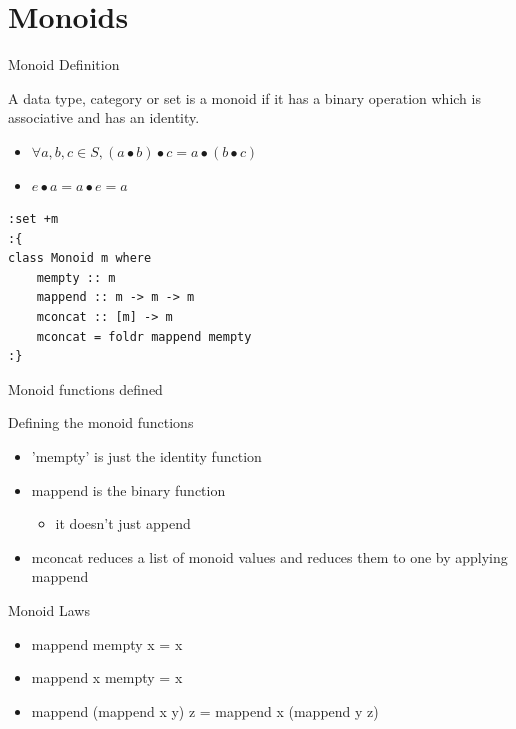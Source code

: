 \documentclass[presetation]{beamer}
\begin{document}
\section{Monoids}
\label{sec:org2d0884c}
\begin{frame}[fragile,label={sec:orga1e3a60}]{Monoid Definition}
 \begin{definition}
A data type, category or set is a \alert{monoid} if it has a binary
operation \textbullet{} which is associative and has an identity.
\begin{itemize}
\item \(\forall a,b,c \in S, (a \bullet b) \bullet c = a \bullet (b \bullet c)\)
\item \(e \bullet a = a \bullet e = a\)
\end{itemize}

\begin{verbatim}
:set +m
:{
class Monoid m where
    mempty :: m
    mappend :: m -> m -> m
    mconcat :: [m] -> m
    mconcat = foldr mappend mempty
:}
\end{verbatim}
\end{definition}
\end{frame}

\begin{frame}[label={sec:org5dea61c}]{Monoid functions defined}
\begin{block}{Defining the monoid functions}
\begin{itemize}
\item 'mempty' is just the identity function
\item mappend is the binary function
\begin{itemize}
\item \alert{it doesn't just append}
\end{itemize}
\item mconcat reduces a list of monoid values and reduces them to one by
applying mappend
\end{itemize}
\end{block}
\end{frame}

\begin{frame}[label={sec:org5b3bf14}]{Monoid Laws}
\begin{theorem}
\begin{itemize}
\item mappend mempty x = x
\item mappend x mempty = x
\item mappend (mappend x y) z = mappend x (mappend y z)
\end{itemize}
\end{theorem}
\end{frame}
\end{document}
